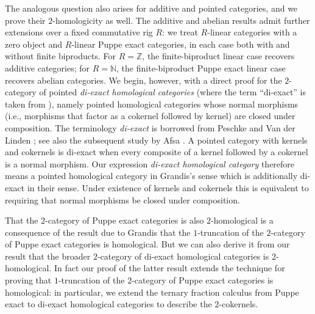 \documentclass[11pt,reqno,a4paper]{amsart}
\theoremstyle{definition}
\theoremstyle{remark}
\newcommand{\0}{\mathbf{0}}
\renewcommand{\1}{\mathbf{1}}
\begin{document}
The analogous question also arises for additive and pointed categories, and we prove their $2$-homologicity as well. The additive and abelian results admit further extensions over a fixed commutative rig $R$: we treat $R$-linear categories with a zero object and $R$-linear Puppe exact categories, in each case both with and without finite biproducts. For $R=\mathbb Z$, the finite-biproduct linear case recovers additive categories; for $R=\mathbb N$, the finite-biproduct Puppe exact linear case recovers abelian categories. We begin, however, with a direct proof for the $2$-category of pointed \emph{di-exact homological categories} (where the term ``di-exact'' is taken from \cite{PeschkeLinden}), namely pointed homological categories whose normal morphisms (i.e., morphisms that factor as a cokernel followed by kernel) are closed under composition. The terminology \emph{di-exact} is borrowed from Peschke and Van der Linden
\cite[Definition~2.1.8]{PeschkeLinden}; see also the subsequent
study by Afsa \cite{Afsa}. A pointed category
with kernels and cokernels is di-exact when every composite of a kernel 
followed by a cokernel is a normal morphism. Our expression
\emph{di-exact homological category} therefore means a pointed
homological category in Grandis's sense which is additionally
di-exact in their sense. Under existence of kernels and cokernels this
is equivalent to requiring that normal morphisms be closed under
composition. 

That the $2$-category of Puppe exact categories is also $2$-homological is a consequence of the result due to Grandis that the $1$-truncation of the $2$-category of Puppe exact categories is homological. But we can also derive it from our result that the broader $2$-category of di-exact homological categories is $2$-homological. In fact our proof of the latter result extends the technique for proving that $1$-truncation of the $2$-category of Puppe exact categories is homological: in particular, we extend the ternary fraction calculus from Puppe exact to di-exact homological categories to describe the $2$-cokernels.
\end{document}
